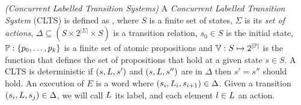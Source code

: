 \begin{definition}
	\label{def:CLTS}\emph{(Concurrent Labelled Transition Systems)} 
	A \emph{Concurrent Labelled Transition System} (CLTS) is defined as 
	\cltsDef, 
	where $S$ is a finite set of states, $\Sigma$ is its {\em set of actions}, $\Delta \subseteq (S \times 2^{|\Sigma|} \times S)$ is a transition relation, $s_0 \in S$ is the initial state,
	 $\mathbb{P} : \{p_0,\ldots,p_k\}$ is a finite set of atomic 
	 propositions and $\mathbb{V} : S \mapsto  2^{|\mathbb{P}|}$ is the function that defines the set of propositions that hold at a given state $s \in S$.  
	A CLTS is deterministic if $(s,L,s')$ and $(s,L,s'')$ are in $\Delta$ then $s'=s''$ should hold.
	An execution of $E$ is a word \executionDef where $(s_i, L_i, s_{i+1}) \in \Delta$. 
	Given a transition $(s_i, L, s_j) \in \Delta$, we will call $L$ its label, and each element $l \in L$ an action.
\end{definition}